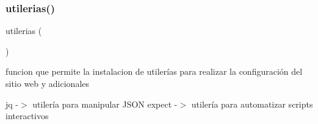 \subsubsection{\texorpdfstring{utilerias()}{utilerias()}}
{\footnotesize\ttfamily utilerias (\begin{DoxyParamCaption}{ }\end{DoxyParamCaption})}



funcion que permite la instalacion de utilerías para realizar la configuración del sitio web y adicionales 

jq -\/$>$ utilería para manipular J\+S\+ON expect -\/$>$ utilería para automatizar scripts interactivos 